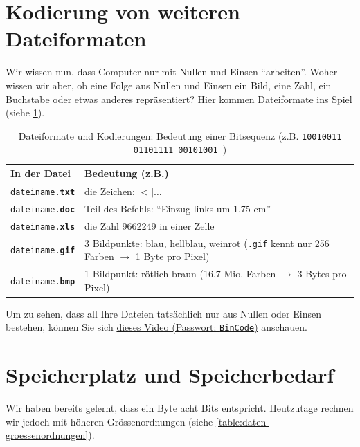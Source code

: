 \section{Kodierung von weiteren Dateiformaten}
Wir wissen nun, dass Computer nur mit Nullen und Einsen \enquote{arbeiten}. Woher wissen wir aber, ob eine Folge aus Nullen und Einsen ein Bild, eine Zahl, ein Buchstabe oder etwas anderes repräsentiert? Hier kommen Dateiformate ins Spiel (siehe \cref{table:formats-codes}).

\begin{table}[H]
	\centering
	\begin{tabular}{l|p{11cm}}
		\textbf{In der Datei}           & \textbf{Bedeutung (z.B.)}                                                                                 \\\midrule
		\texttt{dateiname.\textbf{txt}} & die Zeichen: $<|\ldots$                                                                                   \\
		\texttt{dateiname.\textbf{doc}} & Teil des Befehls: \enquote{Einzug links um 1.75 cm}                                                       \\
		\texttt{dateiname.\textbf{xls}} & die Zahl 9662249 in einer Zelle                                                                           \\
		\texttt{dateiname.\textbf{gif}} & 3 Bildpunkte: blau, hellblau, weinrot (\texttt{.gif} kennt nur 256 Farben $\rightarrow$ 1 Byte pro Pixel) \\
		\texttt{dateiname.\textbf{bmp}} & 1 Bildpunkt: rötlich-braun (16.7 Mio. Farben $\rightarrow$ 3 Bytes pro Pixel)
	\end{tabular}
	\caption{Dateiformate und Kodierungen: Bedeutung einer Bitsequenz (z.B. \texttt{10010011   01101111   00101001
		})}
	\label{table:formats-codes}
\end{table}

\begin{myexercise}
	Um zu sehen, dass all Ihre Dateien tatsächlich nur aus Nullen oder Einsen bestehen, können Sie sich \href{https://cvb.synology.me:5001/d/s/17j56PD0TR1s6D9dFpPiexLX5RNNUTK4/psAJkcIbyyhKXtCqFnxQVzUAr_o8XvVC-FbZAcEBqGQ0}{dieses Video (Passwort: \texttt{BinCode})} anschauen.
\end{myexercise}


\section{Speicherplatz und Speicherbedarf}
Wir haben bereits gelernt, dass ein Byte acht Bits entspricht. Heutzutage rechnen wir jedoch mit höheren Grössenordnungen (siehe \cref{table:daten-groessenordnungen}).


